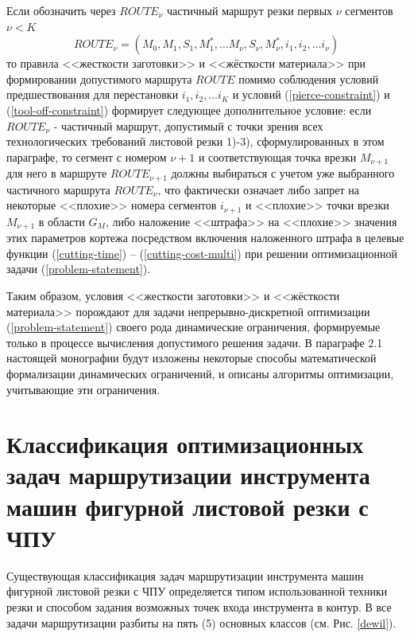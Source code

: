 \documentclass[11pt,twoside]{report}
\newcounter{lem}
\begin{document}
Если обозначить через
$ROUTE_\nu$
частичный маршрут резки первых $\nu$
сегментов
$\nu < K$
\begin{equation}
  ROUTE_\nu = (M_0, M_1, S_1, M_1^*, \dots M_\nu, S_\nu, M_\nu^*, i_1, i_2, \dots i_\nu)
\end{equation}
то правила <<жесткости заготовки>> и <<жёсткости материала>>
при формировании допустимого маршрута
$ROUTE$
помимо соблюдения условий предшествования для перестановки
$i_1, i_2, \dots i_K$
и условий (\ref{pierce-constraint}) и (\ref{tool-off-constraint})
формирует следующее дополнительное условие:
если
$ROUTE_\nu$ - частичный маршрут,
допустимый с точки зрения всех технологических
требований листовой резки 1)-3),
сформулированных в этом параграфе,
то сегмент с номером $\nu+1$
и соответствующая точка врезки $M_{\nu+1}$
для него в маршруте
$ROUTE_{\nu+1}$
должны выбираться с учетом уже выбранного частичного маршрута
$ROUTE_\nu$,
что фактически означает либо запрет
на некоторые <<плохие>> номера сегментов
$i_{\nu+1}$
и <<плохие>> точки врезки
$M_{\nu+1}$
в области  $G_M$,
либо наложение <<штрафа>> на <<плохие>> значения
этих параметров кортежа
посредством включения наложенного штрафа в целевые функции
(\ref{cutting-time}) – (\ref{cutting-cost-multi})
при решении оптимизационной задачи (\ref{problem-statement}).

Таким образом,
условия <<жесткости заготовки>> и <<жёсткости материала>>
порождают для задачи непрерывно-дискретной оптимизации (\ref{problem-statement})
своего рода динамические ограничения,
формируемые только в процессе вычисления допустимого решения задачи.
В параграфе 2.1
настоящей монографии будут изложены
некоторые способы математической формализации динамических ограничений,
и описаны алгоритмы оптимизации,
учитывающие эти ограничения.





\section{Классификация оптимизационных задач маршрутизации инструмента машин фигурной листовой резки с ЧПУ}

Существующая  классификация задач маршрутизации инструмента
машин фигурной листовой резки с ЧПУ определяется
типом использованной техники резки и способом задания
возможных точек входа инструмента в контур.
В \cite{intro13}
все задачи маршрутизации разбиты на пять (5) основных классов
(см. Рис. \ref{dewil}).
\end{document}
